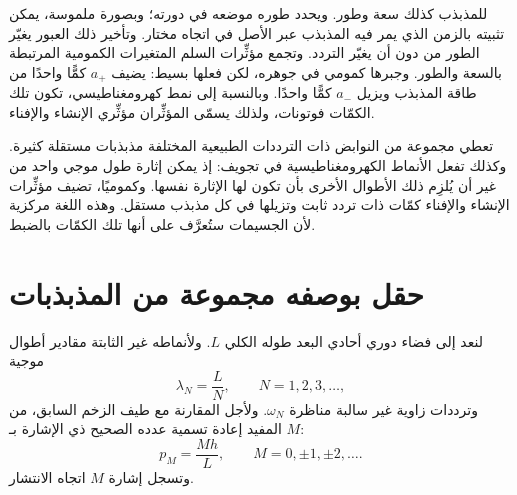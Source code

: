 للمذبذب كذلك سعة وطور. ويحدد طوره موضعه في دورته؛ وبصورة ملموسة، يمكن تثبيته بالزمن الذي يمر فيه المذبذب عبر الأصل في اتجاه مختار. وتأخير ذلك العبور يغيّر الطور من دون أن يغيّر التردد. وتجمع مؤثِّرات السلم المتغيرات الكمومية المرتبطة بالسعة والطور. وجبرها كمومي في جوهره، لكن فعلها بسيط: يضيف \(a_+\) كمًّا واحدًا من طاقة المذبذب ويزيل \(a_-\) كمًّا واحدًا. وبالنسبة إلى نمط كهرومغناطيسي، تكون تلك الكمّات فوتونات، ولذلك يسمّى المؤثِّران مؤثِّري الإنشاء والإفناء.

\begin{classroomqa}
\end{classroomqa}

تعطي مجموعة من النوابض ذات الترددات الطبيعية المختلفة مذبذبات مستقلة كثيرة. وكذلك تفعل الأنماط الكهرومغناطيسية في تجويف: إذ يمكن إثارة طول موجي واحد من غير أن يُلزِم ذلك الأطوال الأخرى بأن تكون لها الإثارة نفسها. وكموميًا، تضيف مؤثِّرات الإنشاء والإفناء كمّات ذات تردد ثابت وتزيلها في كل مذبذب مستقل. وهذه اللغة مركزية لأن الجسيمات ستُعرَّف على أنها تلك الكمّات بالضبط.

\section{حقل بوصفه مجموعة من المذبذبات}

لنعد إلى فضاء دوري أحادي البعد طوله الكلي \(L\). ولأنماطه غير الثابتة مقادير أطوال موجية
\begin{equation}
\lambda_N=\frac{L}{N},
\qquad N=1,2,3,\ldots ,
\end{equation}
وترددات زاوية غير سالبة مناظرة \(\omega_N\). ولأجل المقارنة مع طيف الزخم السابق، من المفيد إعادة تسمية عدده الصحيح ذي الإشارة بـ \(M\):
\begin{equation}
p_M=\frac{Mh}{L},
\qquad M=0,\pm1,\pm2,\ldots .
\end{equation}
وتسجل إشارة \(M\) اتجاه الانتشار.

